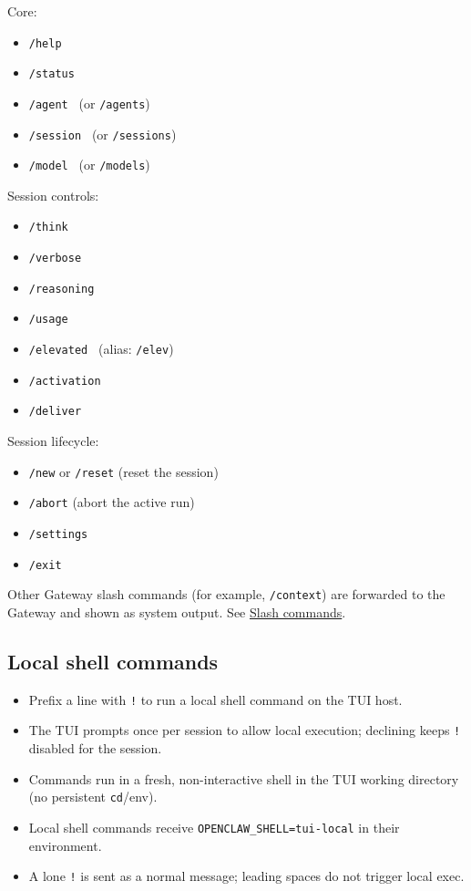 Core:

\begin{itemize}
  \item \texttt{/help}
  \item \texttt{/status}
  \item \texttt{/agent } (or \texttt{/agents})
  \item \texttt{/session } (or \texttt{/sessions})
  \item \texttt{/model } (or \texttt{/models})
\end{itemize}


Session controls:

\begin{itemize}
  \item \texttt{/think }
  \item \texttt{/verbose }
  \item \texttt{/reasoning }
  \item \texttt{/usage }
  \item \texttt{/elevated } (alias: \texttt{/elev})
  \item \texttt{/activation }
  \item \texttt{/deliver }
\end{itemize}


Session lifecycle:

\begin{itemize}
  \item \texttt{/new} or \texttt{/reset} (reset the session)
  \item \texttt{/abort} (abort the active run)
  \item \texttt{/settings}
  \item \texttt{/exit}
\end{itemize}


Other Gateway slash commands (for example, \texttt{/context}) are forwarded to the Gateway and shown as system output. See \href{/tools/slash-commands}{Slash commands}.

\subsection{Local shell commands}


\begin{itemize}
  \item Prefix a line with \texttt{!} to run a local shell command on the TUI host.
  \item The TUI prompts once per session to allow local execution; declining keeps \texttt{!} disabled for the session.
  \item Commands run in a fresh, non-interactive shell in the TUI working directory (no persistent \texttt{cd}/env).
  \item Local shell commands receive \texttt{OPENCLAW\_SHELL=tui-local} in their environment.
  \item A lone \texttt{!} is sent as a normal message; leading spaces do not trigger local exec.
\end{itemize}


